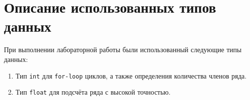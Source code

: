 \section{Описание использованных типов данных}

При выполнении лабораторной работы были использованный следующие типы данных:
\begin{enumerate}
    \item Тип \texttt{int} для \texttt{for-loop} циклов, а также определения количества членов ряда.
    \item Тип \texttt{float} для подсчёта ряда с высокой точностью.
\end{enumerate}
